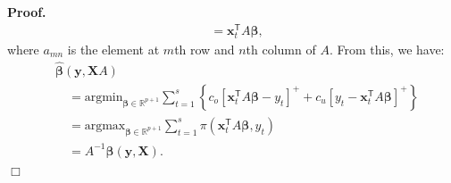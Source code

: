 \documentclass[a4paper,11pt]{article}
\newenvironment{proof}
 {\begin{trivlist} \item[] {\bf Proof.\ }}{\hfill$\Box$ \end{trivlist}}
\begin{document}
\begin{proof}
\[\begin{aligned}
            &=\mathbf{x}_t^{\mathsf{T}}A\boldsymbol{\beta},
        \end{aligned}
    \]
    where $a_{mn}$ is the element at $m$th row and $n$th column of $A$.
    From this, we have:
    \[
        \begin{aligned}
            &\hat{\boldsymbol{\beta}}(\mathbf{y},\mathbf{X}A)\\
            &\quad=\text{argmin}_{\boldsymbol{\beta}\in \mathbb{R}^{p+1}}\displaystyle\sum_{t=1}^s{\left\{c_o\left[\mathbf{x}_t^{\mathsf{T}}A\boldsymbol{\beta}-y_t\right]^{+}+c_u\left[y_t-\mathbf{x}_t^{\mathsf{T}}A\boldsymbol{\beta}\right]^{+}\right\}}\\
            &\quad=\text{argmax}_{\boldsymbol{\beta}\in \mathbb{R}^{p+1}}\displaystyle\sum_{t=1}^s{\pi(\mathbf{x}_t^{\mathsf{T}}A\boldsymbol{\beta},y_t)}\\
            &\quad=A^{-1}\hat{\boldsymbol{\beta}}(\mathbf{y},\mathbf{X}).
        \end{aligned}
    \]
\end{proof}
\end{document}
